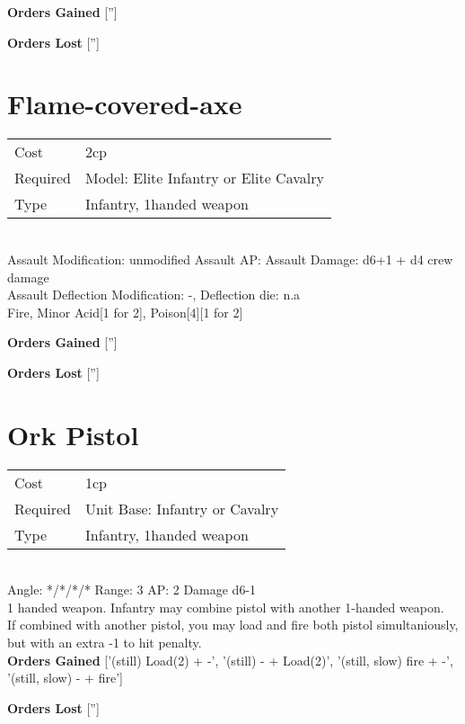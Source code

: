 {\bf Orders Gained}
['']

{\bf Orders Lost}
['']
\section{ Flame-covered-axe }

\begin{tabular}{ll}
    Cost & 2cp \\
    Required & Model: Elite Infantry or Elite Cavalry\\
    Type & Infantry, 1handed weapon\\
\end{tabular}
\ \\
Assault Modification: unmodified Assault AP:  Assault Damage: d6+1 + d4 crew damage\\
Assault Deflection Modification: -, Deflection die: n.a \\
Fire, Minor Acid[1 for 2], Poison[4][1 for 2]



{\bf Orders Gained}
['']

{\bf Orders Lost}
['']
\section{ Ork Pistol }

\begin{tabular}{ll}
    Cost & 1cp \\
    Required & Unit Base: Infantry or Cavalry\\
    Type & Infantry, 1handed weapon\\
\end{tabular}
\ \\
\indent Angle: */*/*/* Range: 3  AP: 2 Damage d6-1 \\
1 handed weapon. Infantry may combine pistol with another 1-handed weapon. \\ If combined with another pistol, you may load and fire both pistol simultaniously, but with an extra -1 to hit penalty.
\ \\

{\bf Orders Gained}
['(still) Load(2) + -', '(still) - + Load(2)', '(still, slow) fire + -', '(still, slow) - + fire']

{\bf Orders Lost}
['']
